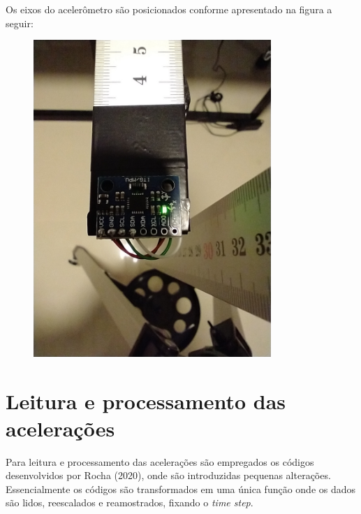 Os eixos do acelerômetro são posicionados conforme apresentado na figura a seguir:

\begin{figure}
\centering
\includegraphics[width=9cm]{../Trabalho5/imagens/PosEixos}
\end{figure}

    \hypertarget{leitura-e-processamento-das-acelerauxe7uxf5es}{%
\section{Leitura e processamento das
acelerações}\label{leitura-e-processamento-das-acelerauxe7uxf5es}}

Para leitura e processamento das acelerações são empregados os códigos
desenvolvidos por Rocha (2020), onde são introduzidas pequenas
alterações. Essencialmente os códigos são transformados em uma única
função onde os dados são lidos, reescalados e reamostrados, fixando o
\emph{time step}.

